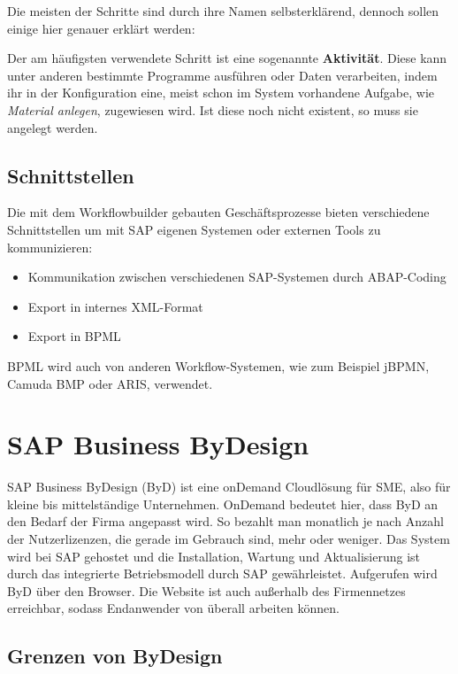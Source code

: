 \documentclass{handout}
\begin{document}
Die meisten der Schritte sind durch ihre Namen selbsterklärend, dennoch sollen einige hier genauer erklärt werden:

Der am häufigsten verwendete Schritt ist eine sogenannte \textbf{Aktivität}. Diese kann unter anderen bestimmte Programme ausführen oder Daten verarbeiten, indem ihr in der Konfiguration eine, meist schon im System vorhandene Aufgabe, wie \textit{Material anlegen}, zugewiesen wird. Ist diese noch nicht existent, so muss sie angelegt werden.

\subsection{Schnittstellen}

Die mit dem Workflowbuilder gebauten Geschäftsprozesse bieten verschiedene Schnittstellen um mit SAP eigenen Systemen oder externen Tools zu kommunizieren:

\begin{itemize}
\item Kommunikation zwischen verschiedenen SAP-Systemen durch ABAP-Coding
\item Export in internes XML-Format
\item Export in BPML
\end{itemize}

BPML wird auch von anderen Workflow-Systemen, wie zum Beispiel jBPMN, Camuda BMP oder ARIS, verwendet.

\section{SAP Business ByDesign}

SAP Business ByDesign (ByD) ist eine onDemand Cloudlösung für SME, also für kleine bis mittelständige Unternehmen. OnDemand bedeutet hier, dass ByD an den Bedarf der Firma angepasst wird. So bezahlt man monatlich je nach Anzahl der Nutzerlizenzen, die gerade im Gebrauch sind, mehr oder weniger. Das System wird bei SAP gehostet und die Installation, Wartung und Aktualisierung ist durch das integrierte Betriebsmodell durch SAP gewährleistet. Aufgerufen wird ByD über den Browser. Die Website ist auch außerhalb des Firmennetzes erreichbar, sodass Endanwender von überall arbeiten können.

\subsection{Grenzen von ByDesign}
\end{document}
